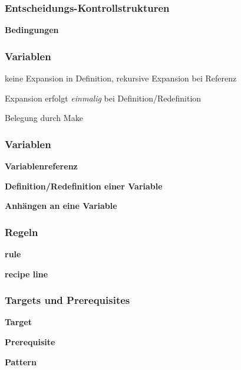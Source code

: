 \begin{frame}
	\frametitle{Entscheidungs-Kontrollstrukturen}
	

	\textbf{Bedingungen}
	
\end{frame}
%

\begin{frame}
\frametitle{Variablen}

	\begin{description}
		\pause
		\item[rekursiv expandierte Variablen] keine Expansion in Definition, rekursive Expansion bei Referenz
		\pause
		\item[einfach expandierte Variablen] Expansion erfolgt \emph{einmalig} bei Definition/Redefinition
		\pause
		\item[automatische Variablen] Belegung durch Make
	\end{description}
\end{frame}

\begin{frame}
\frametitle{Variablen}
	\textbf{Variablenreferenz}
	

	\textbf{Definition/Redefinition einer Variable}
	

	\textbf{Anhängen an eine Variable}
	

	\vfill\eject
\end{frame}

\begin{frame}[allowframebreaks]
\frametitle{Regeln}
	\textbf{rule}
	

	\textbf{recipe line}
	
\end{frame}

\begin{frame}
\frametitle{Targets und Prerequisites}
	\textbf{Target}
	

	\textbf{Prerequisite}
	

	\textbf{Pattern}
	
\end{frame}

